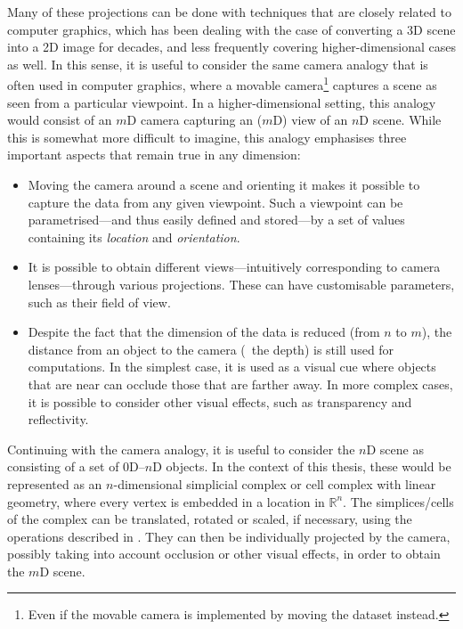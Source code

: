Many of these projections can be done with techniques that are closely related to computer graphics, which has been dealing with the case of converting a 3D scene into a 2D image for decades, and less frequently covering higher-dimensional cases as well.
In this sense, it is useful to consider the same camera analogy that is often used in computer graphics, where a movable camera\footnote{Even if the movable camera is implemented by moving the dataset instead.} captures a scene as seen from a particular viewpoint.
In a higher-dimensional setting, this analogy would consist of an $m$D camera capturing an ($m$D) view of an $n$D scene.
While this is somewhat more difficult to imagine, this analogy emphasises three important aspects that remain true in any dimension:

\begin{itemize}
\item
Moving the camera around a scene and orienting it makes it possible to capture the data from any given viewpoint.
Such a viewpoint can be parametrised---and thus easily defined and stored---by a set of values containing its \emph{location} and \emph{orientation}.

\item
It is possible to obtain different views---intuitively corresponding to camera lenses---through various projections.
These can have customisable parameters, such as their field of view.

\item
Despite the fact that the dimension of the data is reduced (from $n$ to $m$), the distance from an object to the camera (\ie\ the depth) is still used for computations.
In the simplest case, it is used as a visual cue where objects that are near can occlude those that are farther away.
In more complex cases, it is possible to consider other visual effects, such as transparency and reflectivity.
\end{itemize}

Continuing with the camera analogy, it is useful to consider the $n$D scene as consisting of a set of 0D--$n$D objects.
In the context of this thesis, these would be represented as an $n$-dimensional simplicial complex or cell complex with linear geometry, where every vertex is embedded in a location in $\mathbb{R}^n$.
The simplices/cells of the complex can be translated, rotated or scaled, if necessary, using the operations described in .
They can then be individually projected by the camera, possibly taking into account occlusion or other visual effects, in order to obtain the $m$D scene.

